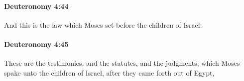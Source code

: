 		\paragraph{Deuteronomy 4:44} %
			\label{DEUTERONOMY-4-44}

			And this is the law which Moses set before the children of Israel:


		\paragraph{Deuteronomy 4:45} %
			\label{DEUTERONOMY-4-45}

			These are the testimonies, and the statutes, and the judgments, which Moses spake unto the children of Israel, after they came forth out of Egypt,


